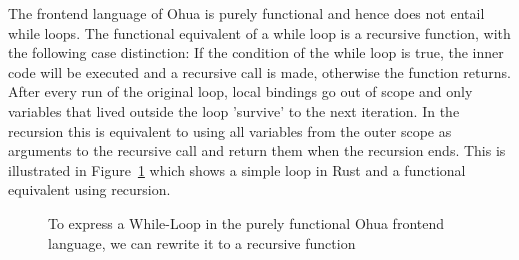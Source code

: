 The frontend language of Ohua is purely functional and hence does not entail while loops. The functional equivalent of a while loop is a recursive function, with the following case distinction: If the condition of the while loop is true, the inner code will be executed and a recursive call is made, otherwise the function returns. After every run of the original loop, local bindings go out of scope and only variables that lived outside the loop 'survive' to the next iteration. In the recursion this is equivalent to using all variables from the outer scope as arguments to the recursive call and return them when the recursion ends. This is illustrated in Figure~\ref{fig:WhileTransform} which shows a simple  loop in Rust and a functional equivalent using recursion. 

\begin{figure}[H]
\centering
\tabskip=0pt
\caption{To express a While-Loop in the purely functional Ohua frontend language, we can rewrite it to a recursive function}
\label{fig:WhileTransform}
\end{figure}

